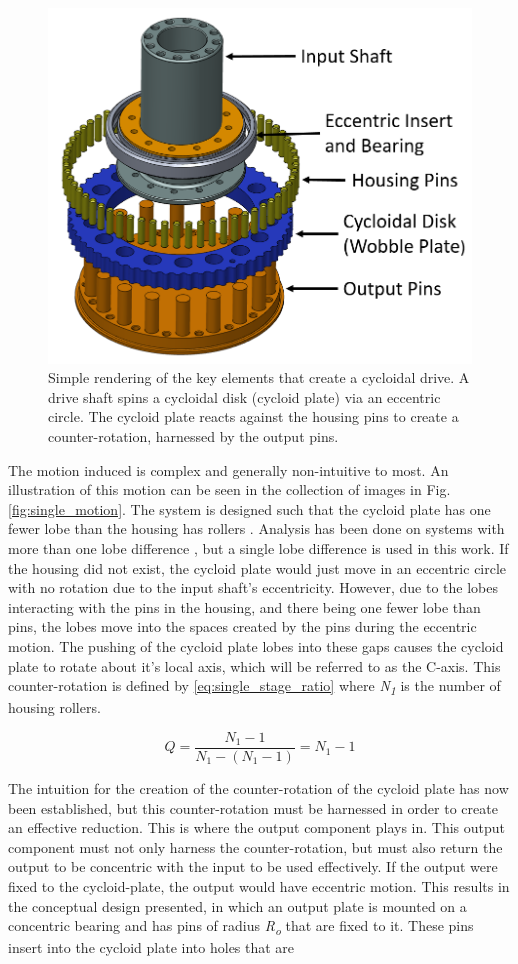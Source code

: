 \begin{figure}[h]
   \centering
   \includegraphics[width=0.60\linewidth]{fig/cycloid_cartoon_v2}
   \caption{Simple rendering of the key elements that create a cycloidal drive.
   A drive shaft spins a cycloidal disk (cycloid plate) via an eccentric circle.
   The cycloid plate reacts against the housing pins to create a counter-rotation, harnessed by the output pins.}
   \label{fig:single_cartoon}
\end{figure}

The motion induced is complex and generally non-intuitive to most. An illustration of this motion can be seen in the collection of images in Fig. \ref{fig:single_motion}. The system is designed such that the cycloid plate has one fewer lobe than the housing has rollers \cite{ref:pollitt}. Analysis has been done on systems with more than one lobe difference \cite{ref:hsieh_traditional}, but a single lobe difference is used in this work. If the housing did not exist, the cycloid plate would just move in an eccentric circle with no rotation due to the input shaft's eccentricity. However, due to the lobes interacting with the pins in the housing, and there being one fewer lobe than pins, the lobes move into the spaces created by the pins during the eccentric motion. The pushing of the cycloid plate lobes into these gaps causes the cycloid plate to rotate about it's local axis, which will be referred to as the C-axis. This counter-rotation is defined by \ref{eq:single_stage_ratio} \cite{ref:on_the_lobe} where \textit{N\textsubscript{1}} is the number of housing rollers.

\begin{equation} \label{eq:single_stage_ratio}
Q = \frac{N_1-1} {N_1 - (N_1 - 1)} = N_1 -1
\end{equation}

The intuition for the creation of the counter-rotation of the cycloid plate has now been established, but this counter-rotation must be harnessed in order to create an effective reduction. This is where the output component plays in. This output component must not only harness the counter-rotation, but must also return the output to be concentric with the input to be used effectively. If the output were fixed to the cycloid-plate, the output would have eccentric motion. This results in the conceptual design presented, in which an output plate is mounted on a concentric bearing and has pins of radius \textit{R\textsubscript{o}} that are fixed to it. These pins insert into the cycloid plate into holes that are 

